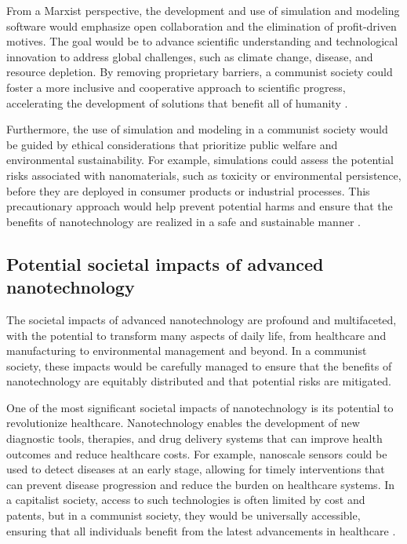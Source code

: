 From a Marxist perspective, the development and use of simulation and modeling software would emphasize open collaboration and the elimination of profit-driven motives. The goal would be to advance scientific understanding and technological innovation to address global challenges, such as climate change, disease, and resource depletion. By removing proprietary barriers, a communist society could foster a more inclusive and cooperative approach to scientific progress, accelerating the development of solutions that benefit all of humanity \cite[pp.~205-212]{drexler1986engines}.

Furthermore, the use of simulation and modeling in a communist society would be guided by ethical considerations that prioritize public welfare and environmental sustainability. For example, simulations could assess the potential risks associated with nanomaterials, such as toxicity or environmental persistence, before they are deployed in consumer products or industrial processes. This precautionary approach would help prevent potential harms and ensure that the benefits of nanotechnology are realized in a safe and sustainable manner \cite[pp.~335-342]{freitas1999nanomedicine}.

\subsection{Potential societal impacts of advanced nanotechnology}

The societal impacts of advanced nanotechnology are profound and multifaceted, with the potential to transform many aspects of daily life, from healthcare and manufacturing to environmental management and beyond. In a communist society, these impacts would be carefully managed to ensure that the benefits of nanotechnology are equitably distributed and that potential risks are mitigated.

One of the most significant societal impacts of nanotechnology is its potential to revolutionize healthcare. Nanotechnology enables the development of new diagnostic tools, therapies, and drug delivery systems that can improve health outcomes and reduce healthcare costs. For example, nanoscale sensors could be used to detect diseases at an early stage, allowing for timely interventions that can prevent disease progression and reduce the burden on healthcare systems. In a capitalist society, access to such technologies is often limited by cost and patents, but in a communist society, they would be universally accessible, ensuring that all individuals benefit from the latest advancements in healthcare \cite[pp.~205-212]{drexler1986engines}.

